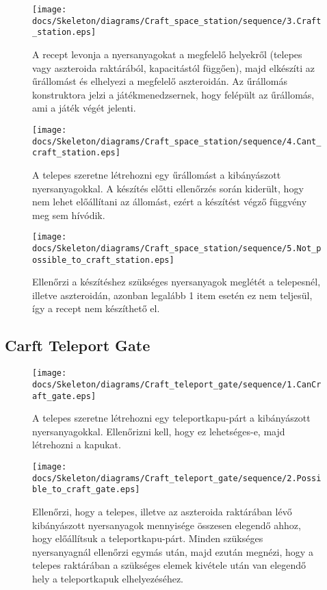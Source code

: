 \begin{figure}[H] 
    \centering 
    \texttt{[image: docs/Skeleton/diagrams/Craft\_space\_station/sequence/3.Craft\_station.eps]} 
    \caption{A recept levonja a nyersanyagokat a megfelelő helyekről (telepes vagy aszteroida raktárából, kapacitástól függően),  majd elkészíti az űrállomást és elhelyezi a megfelelő aszteroidán. Az űrállomás konstruktora jelzi a játékmenedzsernek, hogy felépült az űrállomás, ami a játék végét jelenti. } 
\end{figure} 

\begin{figure}[H] 
    \centering 
    \texttt{[image: docs/Skeleton/diagrams/Craft\_space\_station/sequence/4.Cant\_craft\_station.eps]} 
    \caption{A telepes szeretne létrehozni egy űrállomást a kibányászott nyersanyagokkal.  A készítés előtti ellenőrzés során kiderült, hogy nem lehet előállítani az állomást, ezért a készítést végző függvény meg sem hívódik.} 
\end{figure} 

\begin{figure}[H] 
    \centering 
    \texttt{[image: docs/Skeleton/diagrams/Craft\_space\_station/sequence/5.Not\_possible\_to\_craft\_station.eps]} 
    \caption{Ellenőrzi a készítéshez szükséges nyersanyagok meglétét a telepesnél, illetve aszteroidán, azonban legalább 1 item esetén ez nem teljesül, így a recept nem készíthető el.  } 
\end{figure} 

\subsection{Carft Teleport Gate}

\begin{figure}[H] 
    \centering 
    \texttt{[image: docs/Skeleton/diagrams/Craft\_teleport\_gate/sequence/1.CanCraft\_gate.eps]} 
    \caption{A telepes szeretne létrehozni egy teleportkapu-párt a kibányászott nyersanyagokkal.  Ellenőrizni kell, hogy ez lehetséges-e, majd létrehozni a kapukat.} 
\end{figure} 

\begin{figure}[H] 
    \centering 
    \texttt{[image: docs/Skeleton/diagrams/Craft\_teleport\_gate/sequence/2.Possible\_to\_craft\_gate.eps]} 
    \caption{Ellenőrzi, hogy a telepes, illetve az aszteroida raktárában lévő kibányászott nyersanyagok mennyisége összesen elegendő ahhoz, hogy előállítsuk a teleportkapu-párt. Minden szükséges nyersanyagnál ellenőrzi egymás után, majd ezután megnézi, hogy a telepes raktárában a szükséges elemek kivétele után van elegendő hely a teleportkapuk elhelyezéséhez. } 
\end{figure}

